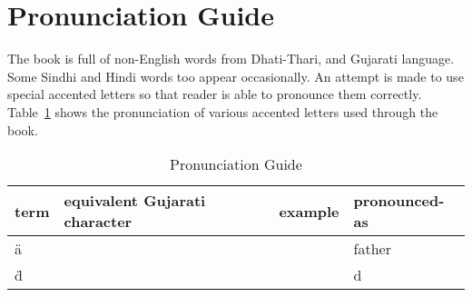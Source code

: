 \chapter*{Pronunciation Guide}

The book is full of non-English words from Dhati-Thari, and Gujarati language. Some
Sindhi and Hindi words too appear occasionally. An attempt is made to use
special accented letters so that reader is able to pronounce them correctly.
Table~\ref{tbl:pronunciation} shows the pronunciation of various accented
letters used through the book.

\begin{table}
\begin{center}
\begin{tabular}{|l|l|l|l|}
\hline
\textbf{term} & \textbf{equivalent Gujarati character}  & \textbf{example} & \textbf{pronounced-as} \\
\hline
\"{a} &  &  & father \\
\"{d} &  &  & d\M{e} \\
\hline

\hline
\end{tabular}
\end{center}
\caption{Pronunciation Guide}
\label{tbl:pronunciation}
\end{table}


